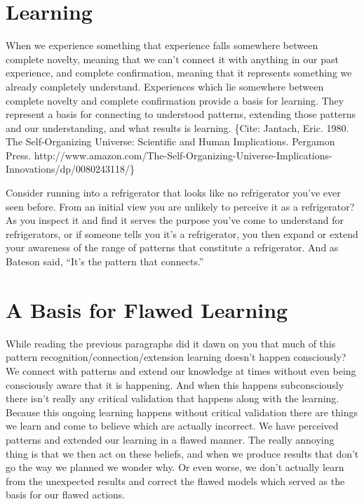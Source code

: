 \documentclass[]{memoir}
\begin{document}
\section{Learning}

When we experience something that experience falls somewhere between
complete novelty, meaning that we can't connect it with anything in our
past experience, and complete confirmation, meaning that it represents
something we already completely understand. Experiences which lie
somewhere between complete novelty and complete confirmation provide a
basis for learning. They represent a basis for connecting to understood
patterns, extending those patterns and our understanding, and what
results is learning. \{Cite: Jantach, Eric. 1980. The Self-Organizing
Universe: Scientific and Human Implications. Pergamon Press.
http://www.amazon.com/The-Self-Organizing-Universe-Implications-Innovations/dp/0080243118/\}

Consider running into a refrigerator that looks like no refrigerator
you've ever seen before. From an initial view you are unlikely to
perceive it as a refrigerator? As you inspect it and find it serves the
purpose you've come to understand for refrigerators, or if someone tells
you it's a refrigerator, you then expand or extend your awareness of the
range of patterns that constitute a refrigerator. And as Bateson said,
``It's the pattern that connects.''

\section{A Basis for Flawed Learning}

While reading the previous paragraphs did it dawn on you that much of
this pattern recognition/connection/extension learning doesn't happen
consciously? We connect with patterns and extend our knowledge at times
without even being consciously aware that it is happening. And when this
happens subconsciously there isn't really any critical validation that
happens along with the learning. Because this ongoing learning happens
without critical validation there are things we learn and come to
believe which are actually incorrect. We have perceived patterns and
extended our learning in a flawed manner. The really annoying thing is
that we then act on these beliefs, and when we produce results that
don't go the way we planned we wonder why. Or even worse, we don't
actually learn from the unexpected results and correct the flawed models
which served as the basis for our flawed actions.
\end{document}
